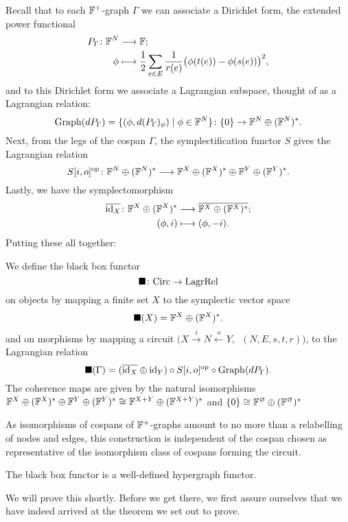 Recall that to each ${\mathbb F}^+$-graph $\Gamma$ we can associate a Dirichlet form, 
the extended power functional 
\begin{align*}
  P_\Gamma{\colon} {\mathbb F}^N &\longrightarrow {\mathbb F}; \\
  \phi &\longmapsto \frac{1}{2} \sum_{e \in E} \frac{1}{r(e)} \big( \phi(t(e)) -
  \phi(s(e))  \big)^2,
\end{align*}
and to this Dirichlet form we associate a Lagrangian subspace, thought of as a
Lagrangian relation:
\[
  \mathrm{Graph}(dP_\Gamma) = \{(\phi,d(P_\Gamma)_\phi) \mid \phi \in
  {\mathbb F}^N\}{\colon} \{0\} \to {\mathbb F}^N \oplus ({\mathbb F}^N)^\ast.
\]
Next, from the legs of the cospan $\Gamma$, the symplectification functor $S$
gives the Lagrangian relation
\[
  S[i,o]^{\mathrm{op}}{\colon} {\mathbb F}^N \oplus ({\mathbb F}^N)^\ast \longrightarrow {\mathbb F}^X \oplus
  ({\mathbb F}^X)^\ast \oplus {\mathbb F}^Y \oplus ({\mathbb F}^Y)^\ast.
\]
Lastly, we have the symplectomorphism
\begin{align*}
  \overline{\mathrm{id}_X}{\colon} {\mathbb F}^X \oplus ({\mathbb F}^X)^\ast &\longrightarrow \overline{{\mathbb F}^X \oplus
  ({\mathbb F}^X)^\ast}; \\
  (\phi,i) &\longmapsto (\phi,-i).
\end{align*}
Putting these all together:
\begin{definition}
  We define the black box functor 
  \[
    \blacksquare{\colon} \mathrm{Circ} \to \mathrm{LagrRel} 
  \]
  on objects by mapping a finite set $X$ to the symplectic vector space 
  \[
    \blacksquare(X) = {\mathbb F}^X \oplus ({\mathbb F}^X)^\ast.
  \]
  and on morphisms by mapping a circuit $\big(X \stackrel{i}\to N
  \stackrel{o}\leftarrow Y, \enspace (N,E,s,t,r)\big)$, to the Lagrangian
  relation
  \[
    \blacksquare(\Gamma) = (\overline{\mathrm{id}_X}\oplus \mathrm{id}_Y) \circ S[i,o]^{\mathrm{op}}
    \circ \mathrm{Graph}(dP_\Gamma).
  \]
  The coherence maps are given by the natural isomorphisms ${\mathbb F}^X \oplus
  ({\mathbb F}^X)^\ast \oplus {\mathbb F}^Y \oplus ({\mathbb F}^Y)^\ast \cong {\mathbb F}^{X+Y} \oplus
  ({\mathbb F}^{X+Y})^\ast$ and $\{0\} \cong {\mathbb F}^\varnothing \oplus ({\mathbb F}^\varnothing)^\ast$
\end{definition}

As isomorphisms of cospans of ${\mathbb F}^+$-graphs amount to no more than a 
relabelling of nodes and edges, this construction is independent of the cospan 
chosen as representative of the isomorphism class of cospans forming the 
circuit.

\begin{theorem} \label{thm:main}
  The black box functor is a well-defined hypergraph functor.
\end{theorem}

We will prove this shortly. Before we get there, we first assure ourselves that
we have indeed arrived at the theorem we set out to prove.

